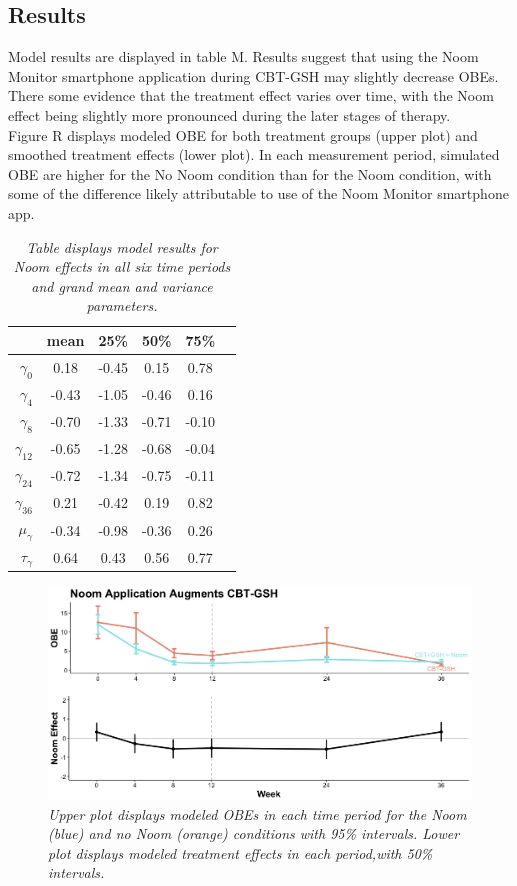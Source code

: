 \documentclass[12pt, oneside]{article}
\begin{document}
\subsection{Results}
Model results are displayed in table M.  Results suggest that using the Noom Monitor smartphone application during CBT-GSH may slightly decrease OBEs.  There some evidence that the treatment effect varies over time, with the Noom effect being slightly more pronounced during the later stages of therapy.
\\

Figure R displays modeled OBE for both treatment groups (upper plot) and smoothed treatment effects (lower plot).  In each measurement period, simulated OBE are higher for the No Noom condition than for the Noom condition, with some of the difference likely attributable to use of the Noom Monitor smartphone app.  

\begin{table}[t]
\centering
\begin{tabular}{r c c c c c}
  \hline
 & mean & 25\% & 50\% & 75\% \\ 
  \hline
  $\gamma_0$ & 0.18 & -0.45 & 0.15 & 0.78   \\ 
  $\gamma_4$ & -0.43 & -1.05 & -0.46 & 0.16   \\ 
  $\gamma_8$ & -0.70 & -1.33 & -0.71 & -0.10   \\  
  $\gamma_{12}$ & -0.65 & -1.28 & -0.68 & -0.04   \\  
  $\gamma_{24}$ & -0.72 & -1.34 & -0.75 & -0.11  \\  
  $\gamma_{36}$ & 0.21 & -0.42 & 0.19 & 0.82  \\ 
  \hline \hline
  $\mu_{\gamma}$ & -0.34 & -0.98 & -0.36 & 0.26  \\ 
  $\tau_{\gamma}$ & 0.64 & 0.43 & 0.56 & 0.77  \\ 
   \hline
\end{tabular}
\caption{\emph{Table displays model results for Noom effects in all six time periods and grand mean and variance parameters.}}
\end{table}


\begin{figure}[h]
\centering
\includegraphics[width=\textwidth, height=\textheight, keepaspectratio]{noom_effect.png}
\caption{\emph{Upper plot displays modeled OBEs in each time period for the Noom (blue) and no Noom (orange) conditions with 95\% intervals.  Lower plot displays modeled treatment effects in each period,with 50\% intervals.}}
\end{figure}
\end{document}
